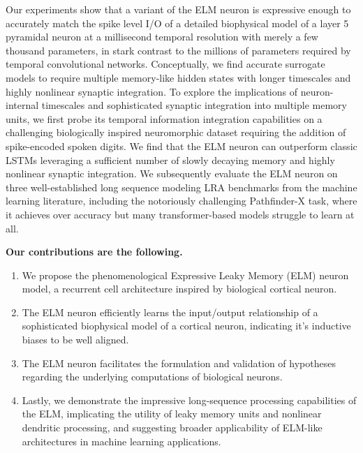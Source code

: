 \documentclass{article} \usepackage{iclr2024_doc_style,times}
\begin{document}
Our experiments show that a variant of the ELM neuron is expressive enough to accurately match the spike level I/O of a detailed biophysical model of a layer 5 pyramidal neuron at a millisecond temporal resolution with merely a few thousand parameters, in stark contrast to the millions of parameters required by temporal convolutional networks. Conceptually, we find accurate surrogate models to require multiple memory-like hidden states with longer timescales and highly nonlinear synaptic integration. 
To explore the implications of neuron-internal timescales and sophisticated synaptic integration into multiple memory units, we first probe its temporal information integration capabilities on a challenging biologically inspired neuromorphic dataset requiring the addition of spike-encoded spoken digits. We find that the ELM neuron can outperform classic LSTMs leveraging a sufficient number of slowly decaying memory and highly nonlinear synaptic integration. We subsequently evaluate the ELM neuron on three well-established long sequence modeling LRA benchmarks from the machine learning literature, including the notoriously challenging Pathfinder-X task, where it achieves over  accuracy but many transformer-based models struggle to learn at all.



\textbf{Our contributions are the following.}

\begin{enumerate}
    \item We propose the phenomenological Expressive Leaky Memory (ELM) neuron model, a recurrent cell architecture inspired by biological cortical neuron. 

    \item The ELM neuron efficiently learns the input/output relationship of a sophisticated biophysical model of a cortical neuron, indicating it's inductive biases to be well aligned.

    \item The ELM neuron facilitates the formulation and validation of hypotheses regarding the underlying computations of biological neurons.

    \item Lastly, we demonstrate the impressive long-sequence processing capabilities of the ELM, implicating the utility of leaky memory units and nonlinear dendritic processing, and suggesting broader applicability of ELM-like architectures in machine learning applications.
\end{enumerate}
\end{document}

